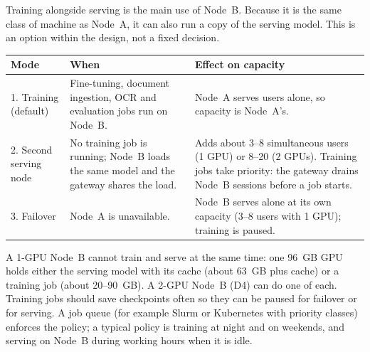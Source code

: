 
Training alongside serving is the main use of Node~B. Because it is the same class of
machine as Node~A, it can also run a copy of the serving model. This is an option within
the design, not a fixed decision.

{\footnotesize
\begin{xltabular}{\textwidth}{@{}Y{0.656} Y{1.031} Y{1.313}@{}}
  \toprule
  Mode & When & Effect on capacity \\
  \midrule
  . Training (default) & Fine-tuning, document ingestion, OCR and evaluation jobs run on Node~B. & Node~A serves users alone, so capacity is Node~A's. \\
  2. Second serving node & No training job is running; Node~B loads the same model and the gateway shares the load. & Adds about 3--8 simultaneous users (1 GPU) or 8--20 (2 GPUs). Training jobs take priority: the gateway drains Node~B sessions before a job starts. \\
  3. Failover & Node~A is unavailable. & Node~B serves alone at its own capacity (3--8 users with 1 GPU); training is paused. \\
  \bottomrule
\end{xltabular}}

A 1-GPU Node~B cannot train and serve at the same time: one 96~GB GPU holds either the
serving model with its cache (about 63~GB plus cache) or a training job (about 20--90~GB).
A 2-GPU Node~B (D4) can do one of each. Training jobs should save checkpoints often so
they can be paused for failover or for serving. A job queue (for example Slurm or
Kubernetes with priority classes) enforces the policy; a typical policy is training at
night and on weekends, and serving on Node~B during working hours when it is idle.


